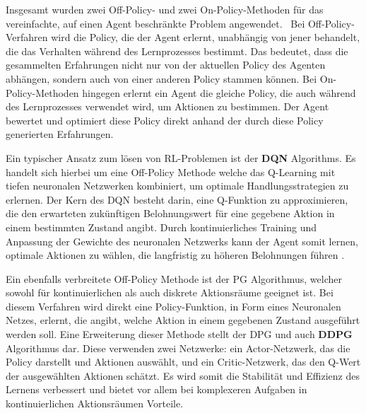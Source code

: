 \documentclass[twocolumn]{webofc}
\begin{document}
Insgesamt wurden zwei Off-Policy- und zwei On-Policy-Methoden für das vereinfachte, auf einen Agent beschränkte Problem angewendet. 
Bei Off-Policy-Verfahren wird die Policy, die der Agent erlernt, unabhängig von jener behandelt, die das Verhalten während des Lernprozesses bestimmt. Das bedeutet, dass die gesammelten Erfahrungen nicht nur von der aktuellen Policy des Agenten abhängen, sondern auch von einer anderen Policy stammen können.
Bei On-Policy-Methoden hingegen erlernt ein Agent die gleiche Policy, die auch während des Lernprozesses verwendet wird, um Aktionen zu bestimmen. Der Agent bewertet und optimiert diese Policy direkt anhand der durch diese Policy generierten Erfahrungen.

Ein typischer Ansatz zum lösen von \ac{RL}-Problemen ist der \textbf{\ac{DQN}} Algorithms. Es handelt sich hierbei um eine Off-Policy Methode welche das Q-Learning mit tiefen neuronalen Netzwerken kombiniert, um optimale Handlungsstrategien zu erlernen. Der Kern des \ac{DQN} besteht darin, eine Q-Funktion zu approximieren, die den erwarteten zukünftigen Belohnungswert für eine gegebene Aktion in einem bestimmten Zustand angibt. %
Durch kontinuierliches Training und Anpassung der Gewichte des neuronalen Netzwerks kann der Agent somit lernen, optimale Aktionen zu wählen, die langfristig zu höheren Belohnungen führen \cite{mnih2013}.

Ein ebenfalls verbreitete Off-Policy Methode ist der \ac{PG} Algorithmus, welcher sowohl für kontinuierlichen als auch diskrete Aktionsräume geeignet ist. Bei diesem Verfahren wird direkt eine Policy-Funktion, in Form eines Neuronalen Netzes, erlernt, die angibt, welche Aktion in einem gegebenen Zustand ausgeführt werden soll.
Eine Erweiterung dieser Methode stellt der \ac{DPG} und auch \textbf{\ac{DDPG}} Algorithmus dar. Diese verwenden zwei Netzwerke: ein Actor-Netzwerk, das die Policy darstellt und Aktionen auswählt, und ein Critic-Netzwerk, das den Q-Wert der ausgewählten Aktionen schätzt. Es wird somit die Stabilität und Effizienz des Lernens verbessert und bietet vor allem bei komplexeren Aufgaben in kontinuierlichen Aktionsräumen Vorteile. 
\end{document}
